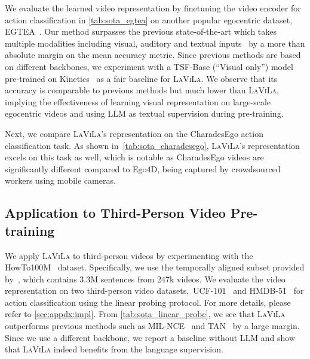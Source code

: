 \documentclass[10pt,twocolumn,letterpaper]{article}
\newcommand{\myparagraph}[1]{\vspace{0pt}\noindent{\bf #1}}
\newcommand{\ours}{\textsc{LaViLa}\xspace}
\newcommand{\charadesego}{CharadesEgo\xspace}
\begin{document}
\myparagraph{EGTEA.}
We evaluate the learned video representation by finetuning the video encoder for action classification in \cref{tab:sota_egtea} on another popular egocentric dataset, EGTEA~\cite{li2018egtea}.
Our method surpasses the previous state-of-the-art which takes multiple modalities including visual, auditory and textual inputs~\cite{kazakos2021little} by a more than  absolute margin on the mean accuracy metric.
Since previous methods are based on different backbones, we experiment with a TSF-Base (``Visual only'') model pre-trained on Kinetics~\cite{carreira2017i3d} as a fair baseline for \ours.
We observe that its accuracy is comparable to previous methods but much lower than \ours, implying the effectiveness of learning visual representation on large-scale egocentric videos and using LLM as textual supervision during pre-training.



\myparagraph{\charadesego.} Next, we compare \ours's representation on the \charadesego action classification task. As shown in~\cref{tab:sota_charadesego}, \ours's representation excels on this task as well, which is notable as CharadesEgo videos are significantly different compared to Ego4D, being captured by crowdsourced workers using mobile cameras.




\subsection{Application to Third-Person Video Pre-training}
\label{sec:expt:third_person}

We apply \ours to third-person videos by experimenting with the HowTo100M~\cite{miech2019howto100m} dataset.
Specifically, we use the temporally aligned subset provided by~\cite{han2022tan}, which contains 3.3M sentences from 247k videos.
We evaluate the video representation on two third-person video datasets,~\ie UCF-101~\cite{soomro2012ucf101} and HMDB-51~\cite{kuehne2011hmdb} for action classification using the linear probing protocol.
For more details, please refer to \cref{sec:appdx:impl}.
From \cref{tab:sota_linear_probe}, we see that \ours outperforms previous methods such as MIL-NCE~\cite{miech2020milnce} and TAN~\cite{han2022tan} by a large margin.
Since we use a different backbone, we report a baseline without LLM and show that \ours indeed benefits from the language supervision.
\end{document}
